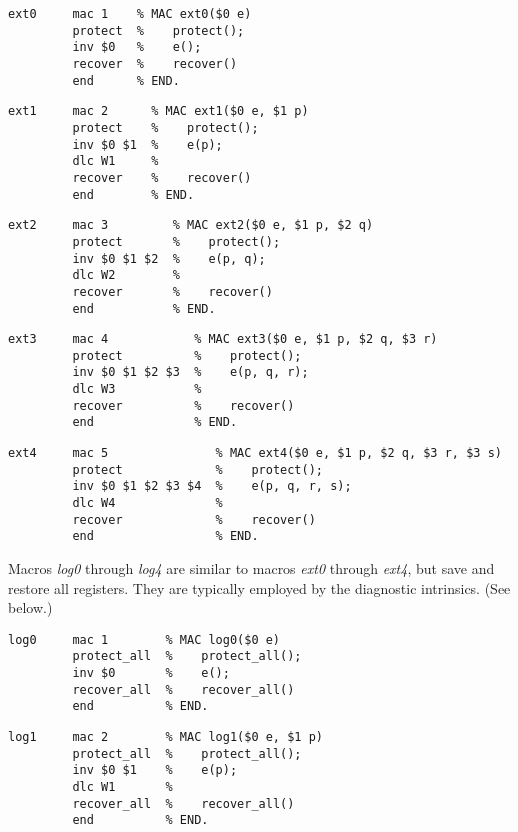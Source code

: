 {\small
\begin{verbatim}
ext0     mac 1    % MAC ext0($0 e)
         protect  %    protect();
         inv $0   %    e();
         recover  %    recover()
         end      % END.
\end{verbatim}}

{\small
\begin{verbatim}
ext1     mac 2      % MAC ext1($0 e, $1 p)
         protect    %    protect();
         inv $0 $1  %    e(p);
         dlc W1     %
         recover    %    recover()
         end        % END.
\end{verbatim}}

{\small
\begin{verbatim}
ext2     mac 3         % MAC ext2($0 e, $1 p, $2 q)
         protect       %    protect();
         inv $0 $1 $2  %    e(p, q);
         dlc W2        %
         recover       %    recover()
         end           % END.
\end{verbatim}}

{\small
\begin{verbatim}
ext3     mac 4            % MAC ext3($0 e, $1 p, $2 q, $3 r)
         protect          %    protect();
         inv $0 $1 $2 $3  %    e(p, q, r);
         dlc W3           %
         recover          %    recover()
         end              % END.
\end{verbatim}}

{\small
\begin{verbatim}
ext4     mac 5               % MAC ext4($0 e, $1 p, $2 q, $3 r, $3 s)
         protect             %    protect();
         inv $0 $1 $2 $3 $4  %    e(p, q, r, s);
         dlc W4              %
         recover             %    recover()
         end                 % END.
\end{verbatim}}

Macros \textit{log0} through \textit{log4} are similar to macros \textit{ext0} through \textit{ext4}, but save and restore all registers. They are typically employed by the diagnostic intrinsics. (See  below.)

{\small
\begin{verbatim}
log0     mac 1        % MAC log0($0 e)
         protect_all  %    protect_all();
         inv $0       %    e();
         recover_all  %    recover_all()
         end          % END.
\end{verbatim}}

{\small
\begin{verbatim}
log1     mac 2        % MAC log1($0 e, $1 p)
         protect_all  %    protect_all();
         inv $0 $1    %    e(p);
         dlc W1       %
         recover_all  %    recover_all()
         end          % END.
\end{verbatim}}

